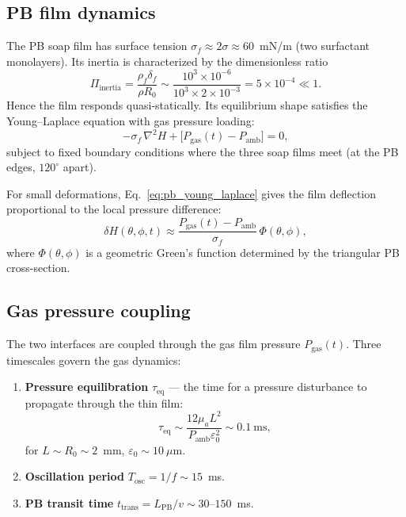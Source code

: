 \documentclass[%
 preprint,
 superscriptaddress,
 amsmath,amssymb,
 aps, prl,
]{revtex4-2}
\begin{document}
\subsection{PB film dynamics}

The PB soap film has surface tension $\sigma_f \approx 2\sigma \approx 60$~mN/m
(two surfactant monolayers).  Its inertia is characterized by the dimensionless ratio
\begin{equation}
\Pi_{\text{inertia}} = \frac{\rho_f\delta_f}{\rho R_0}
\sim \frac{10^3 \times 10^{-6}}{10^3 \times 2\times10^{-3}}
= 5\times10^{-4} \ll 1.
\end{equation}
Hence the film responds quasi-statically.  Its equilibrium shape satisfies
the Young--Laplace equation with gas pressure loading:
\begin{equation}
-\sigma_f\,\nabla^2 H + \bigl[P_{\text{gas}}(t) - P_{\text{amb}}\bigr] = 0,
\label{eq:pb_young_laplace}
\end{equation}
subject to fixed boundary conditions where the three soap films meet
(at the PB edges, $120^\circ$ apart).

For small deformations, Eq.~\eqref{eq:pb_young_laplace} gives the film
deflection proportional to the local pressure difference:
\begin{equation}
\delta H(\theta,\phi,t) \approx
\frac{P_{\text{gas}}(t) - P_{\text{amb}}}{\sigma_f}\,
\Phi(\theta,\phi),
\label{eq:pb_deflection}
\end{equation}
where $\Phi(\theta,\phi)$ is a geometric Green's function determined by
the triangular PB cross-section.

\subsection{Gas pressure coupling}

The two interfaces are coupled through the gas film pressure $P_{\text{gas}}(t)$.
Three timescales govern the gas dynamics:

\begin{enumerate}
\item \textbf{Pressure equilibration} $\tau_{\text{eq}}$ --- the time for a
pressure disturbance to propagate through the thin film:
\begin{equation}
\tau_{\text{eq}} \sim \frac{12\mu_a L^2}{P_{\text{amb}}\varepsilon_0^2}
\sim 0.1~\text{ms},
\end{equation}
for $L \sim R_0 \sim 2$~mm, $\varepsilon_0 \sim 10~\mu\text{m}$.

\item \textbf{Oscillation period} $T_{\text{osc}} = 1/f \sim 15$~ms.

\item \textbf{PB transit time} $t_{\text{trans}} = L_{\text{PB}}/v \sim 30$--$150$~ms.
\end{enumerate}
\end{document}
